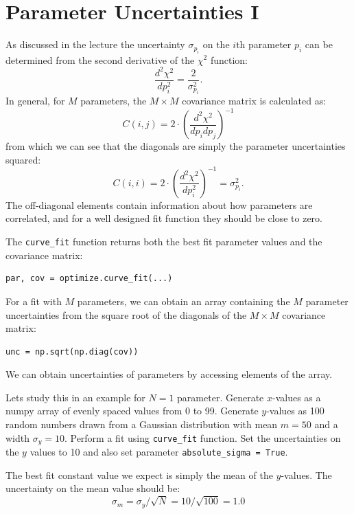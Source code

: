 \section{Parameter Uncertainties I}
\label{sec:sigmatrue}
As discussed in the lecture the uncertainty $\sigma_{p_i}$ on the $i$th parameter $p_i$
can be determined from the second derivative of the $\chi^2$ function:
\begin{displaymath}
\frac{d^2\chi^2}{d p_i^2} = \frac{2}{\sigma_{p_i}^2}.
\end{displaymath}
In general, for $M$ parameters, the $M \times M$ covariance matrix is calculated as:
\begin{displaymath}
C(i,j) = 2 \cdot \left(\dfrac{d^2\chi^2}{d p_i d p_j} \right)^{-1}
\end{displaymath}
from which we can see that the diagonals are simply the parameter uncertainties squared:
\begin{displaymath}
C(i,i) = 2 \cdot \left(\dfrac{d^2\chi^2}{d p_i^2} \right)^{-1} = \sigma^2_{p_i}.
\end{displaymath}
The off-diagonal elements contain information about how parameters are
correlated, and for a well designed fit function they should be close to
zero.

The {\tt curve{\_}fit} function returns both the best fit parameter values and the covariance matrix:
\begin{verbatim}
par, cov = optimize.curve_fit(...)
\end{verbatim}
For a fit with $M$ parameters, we can obtain an array containing the
$M$ parameter uncertainties from the square root of the diagonals of the $M \times M$
covariance matrix:
\begin{verbatim}
unc = np.sqrt(np.diag(cov))
\end{verbatim}

We can obtain uncertainties of parameters by accessing elements of the array.

Lets study this in an example for $N=1$ parameter. Generate $x$-values as a numpy array of evenly spaced values from 0 to 99. Generate $y$-values as 100 random numbers drawn from a Gaussian distribution with mean $m = 50$ and a width $\sigma_y =10$.  Perform a fit using {\tt curve{\_}fit} function. Set the uncertainties on the $y$ values to 10 and also set parameter {\tt absolute{\_}sigma = True}.  

 The best fit constant value we expect is simply the mean of the $y$-values.  The
uncertainty on the mean value should be:
\begin{displaymath}
\sigma_m = \sigma_y / \sqrt{N} = 10 / \sqrt{100} = 1.0
\end{displaymath}

